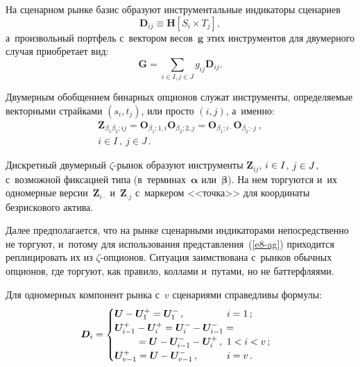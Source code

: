 \begin{multicols}{2}
  На сценарном рынке базис образуют инструментальные индикаторы 
сценариев 
$$
\boldsymbol{D}_{ij}\equiv \boldsymbol{H}\left[S_i\times T_j\right],
$$
 а~произвольный портфель 
с~вектором весов~$\boldsymbol{g}$ этих инструментов для двумерного случая 
приобретает вид: 
  \begin{equation}
  \boldsymbol{G}= \sum\limits_{i\in I, j\in J} g_{ij}\boldsymbol{D}_{ij}.
  \label{e8-ag}
  \end{equation}
  
  Двумерным обобщением бинарных опционов служат инструменты, 
определяемые векторными страйками $(s_i, t_j)$, или просто $(i, j)$, а~именно: 
  \begin{multline*}
  \boldsymbol{Z}_{\beta_1\beta_2;ij}= 
\boldsymbol{O}_{\beta_1;1,i}\boldsymbol{O}_{\beta_2;2,j}=\boldsymbol{O}_{\beta_1;i\cdot}
  \boldsymbol{O}_{\beta_2;\cdot j}\,,\\
   i\in I\,,\ j\in J\,.
\end{multline*}  
  
  Дискретный двумерный $\zeta$-ры\-нок образуют инструменты $\boldsymbol{Z}_{ij}$, 
$i\hm\in I$, $j \hm\in J$, с~возможной фиксацией типа 
(в~терминах~$\boldsymbol{\alpha}$ или~$\boldsymbol{\beta}$). На нем 
торгуются и~их одномерные версии~$\boldsymbol{Z}_{i\cdot}$  и~$\boldsymbol{Z}_{\cdot j}$ 
с~маркером <<точка>> для координаты безрискового актива. 
  
  Далее предполагается, что на рынке сценарными индикаторами 
непосредственно не торгуют, и~потому для использования 
представления~(\ref{e8-ag}) приходится реплицировать их из  
$\zeta$-оп\-ци\-о\-нов. Ситуация заимствована с~рынков обычных опционов, 
где торгуют, как правило, коллами и~путами, но не баттерфляями. 
  
  Для одномерных компонент рынка с~$v$ сценариями справедливы формулы:
   \begin{equation}
  \hspace*{-3mm}\boldsymbol{D}_i= \begin{cases}
  \boldsymbol{U}-\boldsymbol{U}_1^{+} =\boldsymbol{U}_1^{-}\,, &\hspace*{-7mm}i=1\,;\\
  \boldsymbol{U}^+_{i-1}-\boldsymbol{U}_i^+ = \boldsymbol{U}_i^- - \boldsymbol{U}^-_{i-1} ={}&\\
  &\hspace*{-40mm}{}= \boldsymbol{U} -  \boldsymbol{U}^-_{i-1} - \boldsymbol{U}_i^+\,,\ 1<i<v\,;\\
  \boldsymbol{U}^+_{v-1} = \boldsymbol{U}- \boldsymbol{U}^-_{v-1}\,, & \hspace*{-7mm}i=v\,.
  \end{cases}
  \label{e9-ag}
  \end{equation}
  

\end{multicols}
